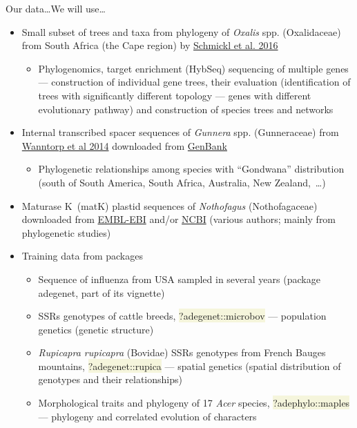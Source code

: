 \documentclass[compress, ucs, xelatex, 11pt, xcolor=svgnames, aspectratio=169,
	hyperref={
		bookmarks=true,
		unicode=true,
		colorlinks=true,
		pdftitle={Molecular data in R},
		plainpages=false,
		pdfauthor={Vojtech Zeisek},
		pdfsubject={Course about phylogeny and evolution in R},
		pdfcreator={XeLaTeX},
		pdfkeywords={R, evolution, phylogeny, molecular data},
		linkcolor=Crimson, %
		anchorcolor=Magenta, %
		citecolor=Magenta, %
		filecolor=Magenta, %
		menucolor=Magenta, %
		urlcolor=DodgerBlue, %
		pdftex},
	url={hyphens, lowtilde} %
	]{beamer}
\renewcommand{\texttt}[1]{\colorbox{Beige}{{\ttfamily #1}}}
\begin{document}
\begin{frame}[allowframebreaks]{Our data\ldots}{We will use\ldots}
\begin{itemize}
\begin{itemize}
			\end{itemize}
			\item Small subset of trees and taxa from phylogeny of \textit{Oxalis} spp. (Oxalidaceae) from South Africa (the Cape region) by \href{https://onlinelibrary.wiley.com/doi/full/10.1111/1755-0998.12487}{Schmickl et al. 2016}
			\begin{itemize}
				\item Phylogenomics, target enrichment (HybSeq) sequencing of multiple genes --- construction of individual gene trees, their evaluation (identification of trees with significantly different topology --- genes with different evolutionary pathway) and construction of species trees and networks
			\end{itemize}
			\item Internal transcribed spacer sequences of \textit{Gunnera} spp. (Gunneraceae) from \href{https://bioone.org/journals/systematic-botany/volume-27/issue-3/0363-6445-27.3.512/Phylogenetic-Relationships-of-Gunnera-based-on-Nuclear-Ribosomal-DNA-ITS/10.1043/0363-6445-27.3.512.full}{Wanntorp et al 2014} downloaded from \href{https://www.ncbi.nlm.nih.gov/popset/22854787}{GenBank}
			\begin{itemize}
				\item Phylogenetic relationships among species with \enquote{Gondwana} distribution (south of South America, South Africa, Australia, New Zealand,~\ldots)
			\end{itemize}
			\item Maturase K~(matK) plastid sequences of \textit{Nothofagus} (Nothofagaceae) downloaded from \href{https://www.ebi.ac.uk/}{EMBL-EBI} and/or \href{https://www.ncbi.nlm.nih.gov/}{NCBI} (various authors; mainly from phylogenetic studies)
			\item Training data from packages
			\begin{itemize}
				\item Sequence of influenza from USA sampled in several years (package adegenet, part of its vignette)
				\item SSRs genotypes of cattle breeds, \texttt{?adegenet::microbov} --- population genetics (genetic structure)
				\item \textit{Rupicapra rupicapra} (Bovidae) SSRs genotypes from French Bauges mountains, \texttt{?adegenet::rupica} --- spatial genetics (spatial distribution of genotypes and their relationships)
				\item Morphological traits and phylogeny of 17 \textit{Acer} species, \texttt{?adephylo::maples} --- phylogeny and correlated evolution of characters

\end{itemize}
\end{itemize}
\end{frame}
\end{document}
